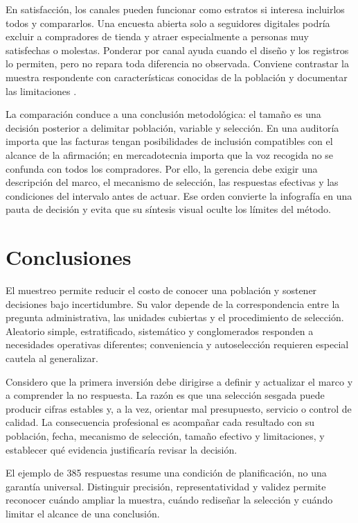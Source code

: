{En satisfacción, los canales pueden funcionar como estratos si interesa incluirlos todos y compararlos. Una encuesta abierta solo a seguidores digitales podría excluir a compradores de tienda y atraer especialmente a personas muy satisfechas o molestas. Ponderar por canal ayuda cuando el diseño y los registros lo permiten, pero no repara toda diferencia no observada. Conviene contrastar la muestra respondente con características conocidas de la población y documentar las limitaciones \citep{holmesBusiness2023,bradley2021}.

La comparación conduce a una conclusión metodológica: el tamaño es una decisión posterior a delimitar población, variable y selección. En una auditoría importa que las facturas tengan posibilidades de inclusión compatibles con el alcance de la afirmación; en mercadotecnia importa que la voz recogida no se confunda con todos los compradores. Por ello, la gerencia debe exigir una descripción del marco, el mecanismo de selección, las respuestas efectivas y las condiciones del intervalo antes de actuar. Ese orden convierte la infografía en una pauta de decisión y evita que su síntesis visual oculte los límites del método.

\clearpage
\section{Conclusiones}
El muestreo permite reducir el costo de conocer una población y sostener decisiones bajo incertidumbre. Su valor depende de la correspondencia entre la pregunta administrativa, las unidades cubiertas y el procedimiento de selección. Aleatorio simple, estratificado, sistemático y conglomerados responden a necesidades operativas diferentes; conveniencia y autoselección requieren especial cautela al generalizar.

Considero que la primera inversión debe dirigirse a definir y actualizar el marco y a comprender la no respuesta. La razón es que una selección sesgada puede producir cifras estables y, a la vez, orientar mal presupuesto, servicio o control de calidad. La consecuencia profesional es acompañar cada resultado con su población, fecha, mecanismo de selección, tamaño efectivo y limitaciones, y establecer qué evidencia justificaría revisar la decisión.

El ejemplo de 385 respuestas resume una condición de planificación, no una garantía universal. Distinguir precisión, representatividad y validez permite reconocer cuándo ampliar la muestra, cuándo rediseñar la selección y cuándo limitar el alcance de una conclusión.

}
